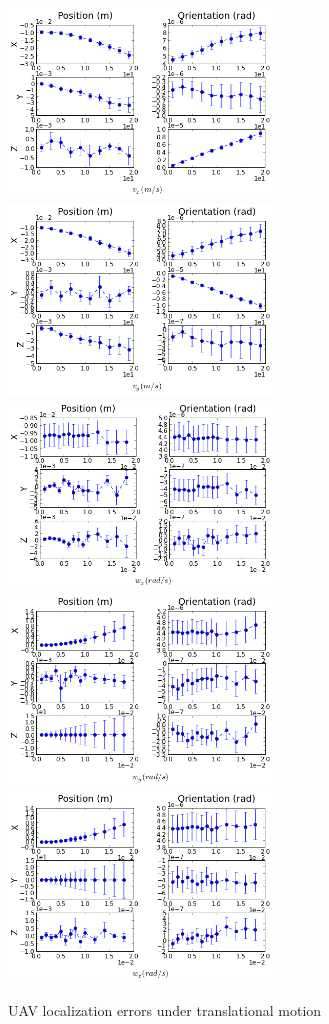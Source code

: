 \begin{figure}[h]
  \centering
  \includegraphics[width=7cm, keepaspectratio=true]{./Figures/SimulationFigures/Figure9.png}
  \includegraphics[width=7cm, keepaspectratio=true]{./Figures/SimulationFigures/Figure10.png}
  \includegraphics[width=7cm, keepaspectratio=true]{./Figures/SimulationFigures/Figure11.png}
  \includegraphics[width=7cm, keepaspectratio=true]{./Figures/SimulationFigures/Figure12.png}
  \includegraphics[width=7cm, keepaspectratio=true]{./Figures/SimulationFigures/Figure13.png}
  \caption{UAV localization errors under translational 
  \label{fig:simfig9-10}
    motion}
\end{figure}
\FloatBarrier

